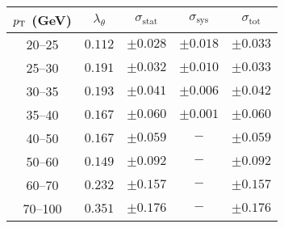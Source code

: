 \begin{tabular}{c|cccc}
$p_\text{T}$ (GeV) & $\lambda_\theta$ & $\sigma_{\text{stat}}$ & $\sigma_{\text{sys}}$ & $\sigma_{\text{tot}}$  \\
\hline
20--25& $0.112$ & $\pm0.028$ & $\pm0.018$ & $\pm0.033$\\
25--30& $0.191$ & $\pm0.032$ & $\pm0.010$ & $\pm0.033$\\
30--35& $0.193$ & $\pm0.041$ & $\pm0.006$ & $\pm0.042$\\
35--40& $0.167$ & $\pm0.060$ & $\pm0.001$ & $\pm0.060$\\
40--50& $0.167$ & $\pm0.059$ & $-$ & $\pm0.059$\\
50--60& $0.149$ & $\pm0.092$ & $-$ & $\pm0.092$\\
60--70& $0.232$ & $\pm0.157$ & $-$ & $\pm0.157$\\
70--100& $0.351$ & $\pm0.176$ & $-$ & $\pm0.176$\\
\end{tabular}
